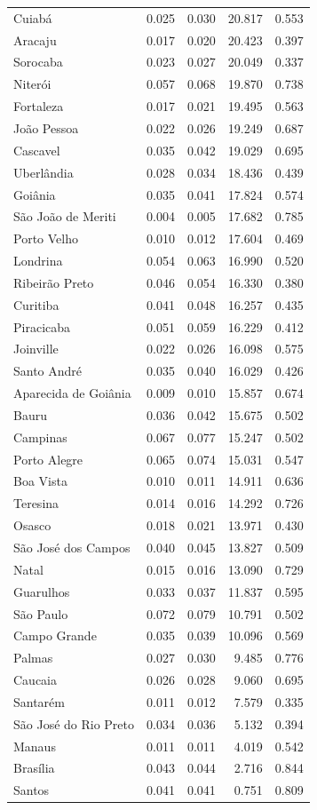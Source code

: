\begin{longtable}{lrrrr}
Cuiabá & 0.025 & 0.030 & 20.817 & 0.553 \\
Aracaju & 0.017 & 0.020 & 20.423 & 0.397 \\
Sorocaba & 0.023 & 0.027 & 20.049 & 0.337 \\
Niterói & 0.057 & 0.068 & 19.870 & 0.738 \\
Fortaleza & 0.017 & 0.021 & 19.495 & 0.563 \\
João Pessoa & 0.022 & 0.026 & 19.249 & 0.687 \\
Cascavel & 0.035 & 0.042 & 19.029 & 0.695 \\
Uberlândia & 0.028 & 0.034 & 18.436 & 0.439 \\
Goiânia & 0.035 & 0.041 & 17.824 & 0.574 \\
São João de Meriti & 0.004 & 0.005 & 17.682 & 0.785 \\
Porto Velho & 0.010 & 0.012 & 17.604 & 0.469 \\
Londrina & 0.054 & 0.063 & 16.990 & 0.520 \\
Ribeirão Preto & 0.046 & 0.054 & 16.330 & 0.380 \\
Curitiba & 0.041 & 0.048 & 16.257 & 0.435 \\
Piracicaba & 0.051 & 0.059 & 16.229 & 0.412 \\
Joinville & 0.022 & 0.026 & 16.098 & 0.575 \\
Santo André & 0.035 & 0.040 & 16.029 & 0.426 \\
Aparecida de Goiânia & 0.009 & 0.010 & 15.857 & 0.674 \\
Bauru & 0.036 & 0.042 & 15.675 & 0.502 \\
Campinas & 0.067 & 0.077 & 15.247 & 0.502 \\
Porto Alegre & 0.065 & 0.074 & 15.031 & 0.547 \\
Boa Vista & 0.010 & 0.011 & 14.911 & 0.636 \\
Teresina & 0.014 & 0.016 & 14.292 & 0.726 \\
Osasco & 0.018 & 0.021 & 13.971 & 0.430 \\
São José dos Campos & 0.040 & 0.045 & 13.827 & 0.509 \\
Natal & 0.015 & 0.016 & 13.090 & 0.729 \\
Guarulhos & 0.033 & 0.037 & 11.837 & 0.595 \\
São Paulo & 0.072 & 0.079 & 10.791 & 0.502 \\
Campo Grande & 0.035 & 0.039 & 10.096 & 0.569 \\
Palmas & 0.027 & 0.030 & 9.485 & 0.776 \\
Caucaia & 0.026 & 0.028 & 9.060 & 0.695 \\
Santarém & 0.011 & 0.012 & 7.579 & 0.335 \\
São José do Rio Preto & 0.034 & 0.036 & 5.132 & 0.394 \\
Manaus & 0.011 & 0.011 & 4.019 & 0.542 \\
Brasília & 0.043 & 0.044 & 2.716 & 0.844 \\
Santos & 0.041 & 0.041 & 0.751 & 0.809 \\
\end{longtable}
